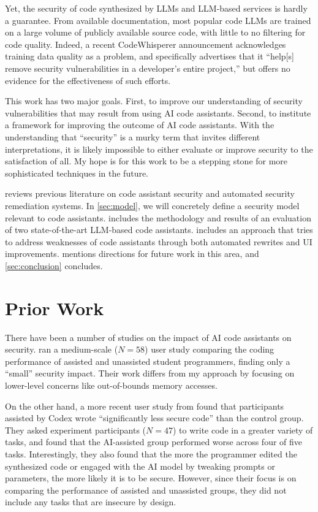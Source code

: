 \documentclass[sigplan,screen,nonacm]{acmart}
\begin{document}
Yet, the security of code synthesized by LLMs and LLM-based services is hardly a guarantee. From available documentation, most popular code LLMs are trained on a large volume of publicly available source code, with little to no filtering for code quality. Indeed, a recent Code\-Whis\-per\-er announcement \cite{codewhisperer-announce-science} acknowledges training data quality as a problem, and specifically advertises that it ``help[s] remove security vulnerabilities in a developer's entire project,'' but offers no evidence for the effectiveness of such efforts.

This work has two major goals. First, to improve our understanding of security vulnerabilities that may result from using AI code assistants. Second, to institute a framework for improving the outcome of AI code assistants. With the understanding that ``security'' is a murky term that invites different interpretations, it is likely impossible to either evaluate or improve security to the satisfaction of all. My hope is for this work to be a stepping stone for more sophisticated techniques in the future.

 reviews previous literature on code assistant security and automated security remediation systems. In \cref{sec:model}, we will concretely define a security model relevant to code assistants.  includes the methodology and results of an evaluation of two state-of-the-art LLM-based code assistants.  includes an approach that tries to address weaknesses of code assistants through both automated rewrites and UI improvements.  mentions directions for future work in this area, and \cref{sec:conclusion} concludes.

\section{Prior Work} \label{sec:prior}

There have been a number of studies on the impact of AI code assistants on security.  \cite{nyuuserstudy} ran a medium-scale ($N = 58$) user study comparing the coding performance of assisted and unassisted student programmers, finding only a ``small'' security impact. Their work differs from my approach by focusing on lower-level concerns like out-of-bounds memory accesses.

On the other hand, a more recent user study from \citeauthor{labstudypub} \cite{labstudypub} found that participants assisted by Codex wrote ``significantly less secure code'' than the control group. They asked experiment participants ($N = 47$) to write code in a greater variety of tasks, and found that the AI-assisted group performed worse across four of five tasks. Interestingly, they also found that the more the programmer edited the synthesized code or engaged with the AI model by tweaking prompts or parameters, the more likely it is to be secure. However, since their focus is on comparing the performance of assisted and unassisted groups, they did not include any tasks that are insecure by design.
\end{document}
